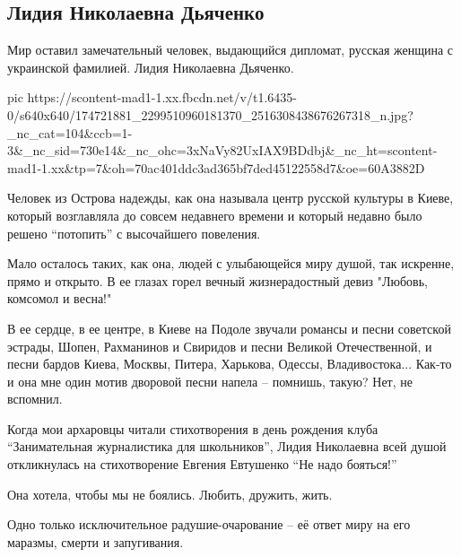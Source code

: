  
 
 
 
 
\subsection{Лидия Николаевна Дьяченко}
\label{sec:16_04_2021.fb.barashev_roman.1.djachenko_lidia_smert}

Мир оставил замечательный человек, выдающийся дипломат, русская женщина с украинской фамилией. Лидия Николаевна Дьяченко.

\ifcmt
  pic https://scontent-mad1-1.xx.fbcdn.net/v/t1.6435-0/s640x640/174721881_2299510960181370_2516308438676267318_n.jpg?_nc_cat=104&ccb=1-3&_nc_sid=730e14&_nc_ohc=3xNaVy82UxIAX9BDdbj&_nc_ht=scontent-mad1-1.xx&tp=7&oh=70ac401ddc3ad365bf7ded45122558d7&oe=60A3882D
\fi

Человек из Острова надежды, как она называла центр русской культуры в Киеве,
который возглавляла до совсем недавнего времени и который недавно было решено
\enquote{потопить} с высочайшего повеления.

Мало осталось таких, как она, людей с улыбающейся миру душой, так искренне,
прямо и открыто. В ее глазах горел вечный жизнерадостный девиз "Любовь,
комсомол и весна!" 

В ее сердце, в ее центре, в Киеве на Подоле звучали романсы и песни советской
эстрады, Шопен, Рахманинов и Свиридов и песни Великой Отечественной, и песни
бардов Киева, Москвы, Питера, Харькова, Одессы, Владивостока... Как-то и она
мне один мотив дворовой песни напела -- помнишь, такую? Нет, не вспомнил.

Когда мои архаровцы читали стихотворения в день рождения клуба \enquote{Занимательная
журналистика для школьников}, Лидия Николаевна всей душой откликнулась на
стихотворение Евгения Евтушенко \enquote{Не надо бояться!}

Она хотела, чтобы мы не боялись. Любить, дружить, жить.

Одно только исключительное радушие-очарование -- её ответ миру на его маразмы, смерти и запугивания. 

